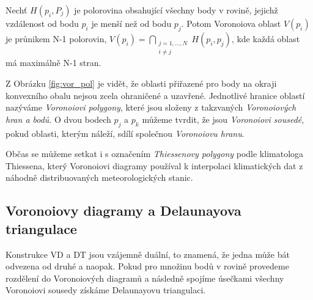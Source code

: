 \documentclass[12pt,a4paper]{article}
\begin{document}
Nechť $H(p_i,P_j)$ je polorovina obsahující všechny body v rovině, jejichž vzdálenost od bodu $p_i$ je menší než od bodu $p_j$. Potom Voronoiova oblast $V(p_i)$ je průnikem N-1 polorovin,
$V(p_i)= \bigcap\limits_{\substack{j=1,...,N \\ i\not=j}}H(p_i,p_j)$, kde každá oblast má maximálně N-1 stran.

Z Obrázku \ref{fig:vor_pol} je vidět, že oblasti přiřazené pro body na okraji konvexního obalu nejsou zcela ohraničené a uzavřené. Jednotlivé hranice oblastí nazýváme \textit{Voronoiovi polygony}, které jsou složeny z takzvaných \textit{Voronoiových hran a bodů}. O dvou bodech $p_j$ a $p_k$ můžeme tvrdit, že jsou \textit{Voronoiovi sousedé}, pokud oblasti, kterým náleží, sdílí společnou \textit{Voronoiovu hranu}. 

Občas se můžeme setkat i s označením \textit{Thiessenovy polygony} podle klimatologa Thiessena, který Voronoiovi diagramy používal k interpolaci klimatických dat z náhodně distribuovaných meteorologických stanic.

\newpage
\subsection{Voronoiovy diagramy a Delaunayova triangulace}

Konstrukce VD a DT jsou vzájemně duální, to znamená, že jedna může bát odvezena od druhé a naopak. 
Pokud pro množinu bodů v rovině provedeme rozdělení do Voronoiových diagramů a následně spojíme úsečkami všechny Voronoiovi sousedy získáme Delaunayovu triangulaci.
\end{document}
